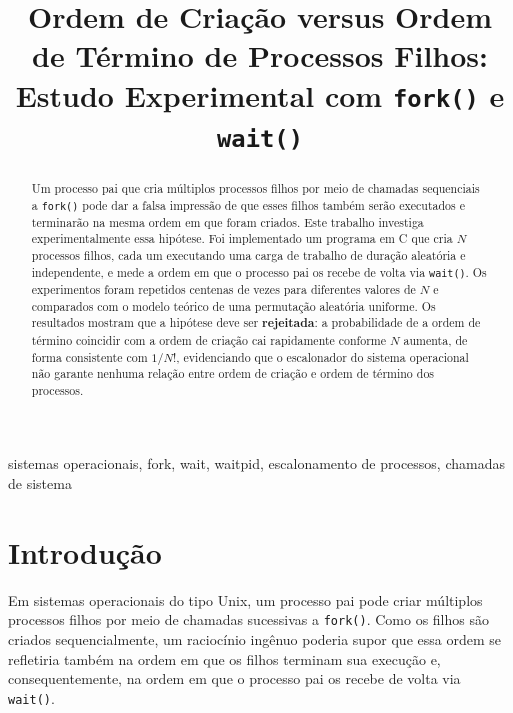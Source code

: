 \documentclass[conference]{IEEEtran}
\begin{document}
\title{Ordem de Criação versus Ordem de Término de Processos Filhos: Estudo Experimental com 
\texttt{fork()} e \texttt{wait()}}

\author{
}

\maketitle

\begin{abstract}
Um processo pai que cria múltiplos processos filhos por meio de chamadas
sequenciais a \texttt{fork()} pode dar a falsa impressão de que esses filhos
também serão executados e terminarão na mesma ordem em que foram criados.
Este trabalho investiga experimentalmente essa hipótese. Foi implementado um
programa em C que cria $N$ processos filhos, cada um executando uma carga de
trabalho de duração aleatória e independente, e mede a ordem em que o
processo pai os recebe de volta via \texttt{wait()}. Os experimentos foram
repetidos centenas de vezes para diferentes valores de $N$ e comparados com o
modelo teórico de uma permutação aleatória uniforme. Os resultados mostram
que a hipótese deve ser \textbf{rejeitada}: a probabilidade de a ordem de
término coincidir com a ordem de criação cai rapidamente conforme $N$
aumenta, de forma consistente com $1/N!$, evidenciando que o escalonador do
sistema operacional não garante nenhuma relação entre ordem de criação e
ordem de término dos processos.
\end{abstract}

\begin{IEEEkeywords}
sistemas operacionais, fork, wait, waitpid, escalonamento de processos,
chamadas de sistema
\end{IEEEkeywords}

\section{Introdução}

Em sistemas operacionais do tipo Unix, um processo pai pode criar múltiplos
processos filhos por meio de chamadas sucessivas a \texttt{fork()}. Como os
filhos são criados sequencialmente, um raciocínio ingênuo poderia supor que
essa ordem se refletiria também na ordem em que os filhos terminam sua
execução e, consequentemente, na ordem em que o processo pai os recebe de
volta via \texttt{wait()}.
\end{document}
